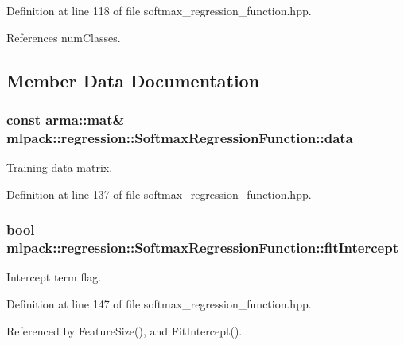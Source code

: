 Definition at line 118 of file softmax\+\_\+regression\+\_\+function.\+hpp.



References num\+Classes.



\subsection{Member Data Documentation}
\subsubsection[{data}]{\setlength{\rightskip}{0pt plus 5cm}const arma\+::mat\& mlpack\+::regression\+::\+Softmax\+Regression\+Function\+::data\hspace{0.3cm}{\ttfamily [private]}}\label{classmlpack_1_1regression_1_1SoftmaxRegressionFunction_a2e3f74b4fcf2b741173be496b6529714}


Training data matrix. 



Definition at line 137 of file softmax\+\_\+regression\+\_\+function.\+hpp.

\subsubsection[{fit\+Intercept}]{\setlength{\rightskip}{0pt plus 5cm}bool mlpack\+::regression\+::\+Softmax\+Regression\+Function\+::fit\+Intercept\hspace{0.3cm}{\ttfamily [private]}}\label{classmlpack_1_1regression_1_1SoftmaxRegressionFunction_aa1347374266670a5662bde98c7554b9f}


Intercept term flag. 



Definition at line 147 of file softmax\+\_\+regression\+\_\+function.\+hpp.



Referenced by Feature\+Size(), and Fit\+Intercept().


